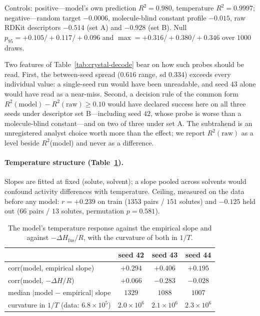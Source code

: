 \noindent Controls: positive---model's own prediction $R^{2}=0.980$, temperature $R^{2}=0.9997$;
negative---random target $-0.0006$, molecule-blind constant profile $-0.015$, raw RDKit
descriptors $-0.514$ (set A) and $-0.928$ (set B). Null $p_{95}=+0.105/+0.117/+0.096$ and
$\max=+0.316/+0.380/+0.346$ over $1000$ draws.

Two features of Table~\ref{tab:crystal-decode} bear on how such probes should be
read. First, the between-seed spread ($0.616$ range, sd $0.334$) exceeds every individual value:
a single-seed run would have been unreadable, and seed $43$ alone would have read as a
near-miss. Second, a decision rule of the common form
$R^{2}(\text{model})-R^{2}(\text{raw})\ge0.10$ would have declared success here on all three
seeds under descriptor set B---including seed $42$, whose probe is worse than a molecule-blind
constant---and on two of three under set A. The subtrahend is an unregistered analyst choice
worth more than the effect; we report $R^{2}(\text{raw})$ as a level beside $R^{2}$(model) and
never as a difference.

\paragraph{Temperature structure (Table~\ref{tab:temp-response}).} Slopes are fitted at fixed (solute, solvent); a slope
pooled across solvents would confound activity differences with temperature. Ceiling, measured on
the data before any model: $r=+0.239$ on train ($1353$ pairs / $151$ solutes) and $-0.125$ held
out ($66$ pairs / $13$ solutes, permutation $p=0.581$).

\begin{table}[t]
\centering\footnotesize
\begin{tabular}{lccc}
\toprule
 & seed 42 & seed 43 & seed 44 \\
\midrule
corr(model, empirical slope) & $+0.294$ & $+0.406$ & $+0.195$ \\
corr(model, $-\Delta H/R$)   & $+0.066$ & $-0.283$ & $-0.028$ \\
median $|$model $-$ empirical$|$ slope & $1329$ & $1088$ & $1007$ \\
curvature in $1/T$ (data: $6.8\times10^{5}$) & $2.0\times10^{6}$ & $2.1\times10^{6}$ & $2.3\times10^{6}$ \\
\bottomrule
\end{tabular}
\caption[The model's temperature response against the empirical slope]{The model's temperature response against the empirical slope and against $-\Delta H_{\text{fus}}/R$, with the curvature of both in $1/T$.}
\label{tab:temp-response}
\end{table}

